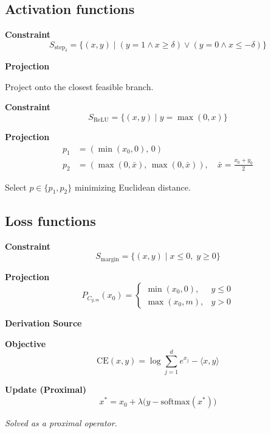 \documentclass{article}
\theoremstyle{plain}
\theoremstyle{definition}
\theoremstyle{remark}
\begin{document}
\subsection{Activation functions}
\begin{tcolorbox}[projectioncard, title=Gapped Step Activation]
\textbf{Constraint}
\[
S_{\mathrm{step}_\delta} =
\{(x,y) \mid (y=1 \land x \geq \delta) \lor (y=0 \land x \leq -\delta)\}
\]

\textbf{Projection}

Project onto the closest feasible branch.
\end{tcolorbox}

\vspace{6pt}

\begin{tcolorbox}[projectioncard, title=ReLU Activation]
\textbf{Constraint}
\[
S_{\mathrm{ReLU}} = \{(x,y) \mid y = \max(0,x)\}
\]

\textbf{Projection}
\[
\begin{aligned}
p_1 &= (\min(x_0,0),\, 0) \\
p_2 &= (\max(0,\bar{x}),\, \max(0,\bar{x})), \quad 
\bar{x} = \frac{x_0 + y_0}{2}
\end{aligned}
\]

Select $p \in \{p_1,p_2\}$ minimizing Euclidean distance.
\end{tcolorbox}
\subsection{Loss functions}
\begin{tcolorbox}[projectioncard, title=Margin Loss]
\textbf{Constraint}
\[
S_{\mathrm{margin}} = \{(x,y) \mid x \leq 0,\; y \geq 0\}
\]

\textbf{Projection}
\[
P_{C_{y,m}}(x_0) =
\begin{cases}
\min(x_0,0), & y \leq 0 \\
\max(x_0,m), & y > 0
\end{cases}
\]
\end{tcolorbox}
\textbf{Derivation Source} \cite{elser2019learning}\cite{bergmeister2025projection}


\vspace{6pt}

\begin{tcolorbox}[projectioncard, title=Categorical Cross-Entropy]
\textbf{Objective}
\[
\mathrm{CE}(x,y) = \log \sum_{j=1}^d e^{x_j} - \langle x,y \rangle
\]

\textbf{Update (Proximal)}
\[
x^* = x_0 + \lambda \bigl(y - \mathrm{softmax}(x^*)\bigr)
\]

\textit{Solved as a proximal operator.}
\end{tcolorbox}

\vspace{6pt}
\end{document}
